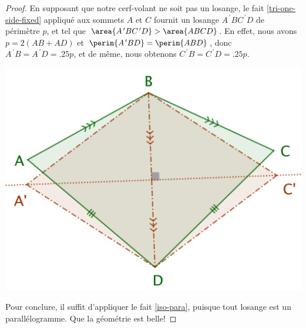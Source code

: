 \begin{proof}
	
	En supposant que notre cerf-volant ne soit pas un losange, le fait \ref{tri-one-side-fixed} appliqué aux sommets $A$ et $C$ fournit un losange $A^{\,\prime}BC^{\,\prime}D$ de périmètre $p$, et tel que $\area{A^{\,\prime}BC^{\,\prime}D} > \area{ABCD}$.
	En effet, nous avons
	$p = 2(AB + AD)$
	et
	$\perim{A^{\,\prime}BD} = \perim{ABD}$,
	donc
	$A^{\,\prime}B = A^{\,\prime}D = \num{.25} p$,
	et de même, nous obtenons
	$C^{\,\prime}B = C^{\,\prime}D = \num{.25} p$.

	\begin{center}
		\includegraphics[scale=.4]{content/quadrilateral/quadrilateral-convex-isopaire.png}
	\end{center}
	
	
	Pour conclure, il suffit d'appliquer le fait \ref{iso-para}, puisque tout losange est un parallélogramme. Que la géométrie est belle!
\end{proof}
